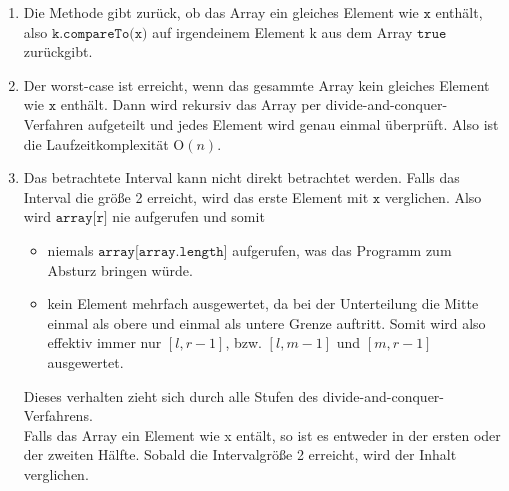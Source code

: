\documentclass[a4paper,11pt]{article}             %
\begin{document}
\begin{enumerate}

\item Die Methode gibt zurück, ob das Array ein gleiches Element wie $\texttt{x}$ enthält, also $\texttt{k.compareTo(x)}$ auf irgendeinem Element k aus dem Array $\texttt{true}$ zurückgibt.

\item Der worst-case ist erreicht, wenn das gesammte Array kein gleiches Element wie $\texttt{x}$ enthält. Dann wird rekursiv das Array per divide-and-conquer-Verfahren aufgeteilt und jedes Element wird genau einmal überprüft. Also ist die Laufzeitkomplexität $\mathrm{O}(n)$.

\item Das betrachtete Interval kann nicht direkt betrachtet werden. Falls das Interval die größe 2 erreicht, wird das erste Element mit $\texttt{x}$ verglichen. Also wird $\texttt{array[r]}$ nie aufgerufen und somit
\begin{itemize}
\item niemals $\texttt{array[array.length]}$ aufgerufen, was das Programm zum Absturz bringen würde.
\item kein Element mehrfach ausgewertet, da bei der Unterteilung die Mitte einmal als obere und einmal als untere Grenze auftritt. Somit wird also effektiv immer nur $[l, r-1]$, bzw. $[l, m-1]$ und $[m, r-1]$ ausgewertet.
\end{itemize}
Dieses verhalten zieht sich durch alle Stufen des divide-and-conquer-Verfahrens.\\
Falls das Array ein Element wie x entält, so ist es entweder in der ersten oder der zweiten Hälfte. Sobald die Intervalgröße 2 erreicht, wird der Inhalt verglichen.

\end{enumerate}

\end{document}
